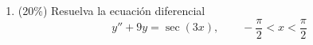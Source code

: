 \documentclass[11pt]{article}
\begin{document}
\begin{enumerate}
\vspace{6cm}

\item{} (20\%) Resuelva la ecuación diferencial
\[
y''+9y = \sec(3x), \qquad -\frac{\pi}{2}<x<\frac{\pi}{2}
\]

\vspace{6cm}
\end{enumerate}

\examfooter
\end{document}

